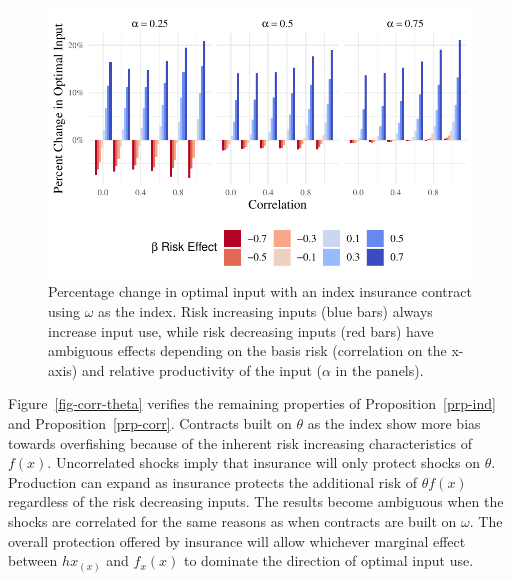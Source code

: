 \documentclass[
  letterpaper,
  DIV=11,
  numbers=noendperiod]{scrartcl}
\theoremstyle{plain}
\theoremstyle{plain}
\theoremstyle{remark}
\begin{document}
\begin{figure}

{\centering \includegraphics{ibi-behavior_files/figure-pdf/fig-corr-1.pdf}

}

\caption{\label{fig-corr}Percentage change in optimal input with an
index insurance contract using \(\omega\) as the index. Risk increasing
inputs (blue bars) always increase input use, while risk decreasing
inputs (red bars) have ambiguous effects depending on the basis risk
(correlation on the x-axis) and relative productivity of the input
(\(\alpha\) in the panels).}

\end{figure}

Figure~\ref{fig-corr-theta} verifies the remaining properties of
Proposition~\ref{prp-ind} and Proposition~\ref{prp-corr}. Contracts
built on \(\theta\) as the index show more bias towards overfishing
because of the inherent risk increasing characteristics of \(f(x)\).
Uncorrelated shocks imply that insurance will only protect shocks on
\(\theta\). Production can expand as insurance protects the additional
risk of \(\theta f(x)\) regardless of the risk decreasing inputs. The
results become ambiguous when the shocks are correlated for the same
reasons as when contracts are built on \(\omega\). The overall
protection offered by insurance will allow whichever marginal effect
between \(hx_(x)\) and \(f_x(x)\) to dominate the direction of optimal
input use.
\end{document}
